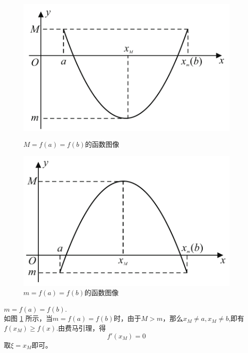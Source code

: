 \begin{figure}[!htb]
\centering
	\begin{minipage}{0.49\linewidth}
		\centering
		\includegraphics[width = 0.93\linewidth]{pic/C-2/Roll_3}
		\vspace*{-1em}
		\caption{$M = f(a) = f(b)$的函数图像}
		\label{Roll2}
	\end{minipage}
	\begin{minipage}{0.49\linewidth}
		\centering
		\includegraphics[width = 0.9\linewidth]{pic/C-2/Roll_2}
		\vspace*{-1em}
		\caption{$m = f(a) = f(b)$的函数图像}
		\label{Roll3}
	\end{minipage}
\end{figure}

\noindent {} $m=f(a)=f(b)$.\\
\kg 如图 \ref{Roll3} 所示，当$m=f(a)=f(b)$时，由于$M>m$，那么$x_M\neq a,x_M\neq b$,即有$f(x_M)\geq f(x)$.由费马引理，得
\begin{equation}
	f'(x_M)=0
\end{equation}
取$\xi=x_M$即可。

